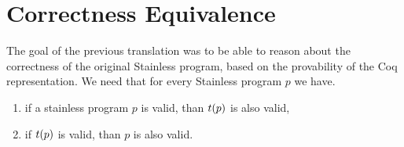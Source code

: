 \section{Correctness Equivalence}

The goal of the previous translation was to be able to reason about the correctness of the original Stainless program, based on the provability of the Coq representation. We need that for every Stainless program $p$ we have.

\begin{enumerate}
	\item if a stainless program $p$ is valid, than $t(p)$ is also valid,
	\item if $t(p)$ is valid, than $p$ is also valid.
\end{enumerate}